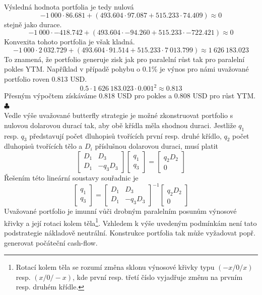 \documentclass[a4paper]{book}
\begin{document}
Výsledná hodnota portfolia je tedy nulová
\begin{equation*}
-1~000 \cdot 86.681 + (493.604 \cdot 97.087 + 515.233 \cdot 74.409) \approx 0
\end{equation*}
stejně jako durace.
\begin{equation*}
-1~000 \cdot -418.742 + (493.604 \cdot -94.260 + 515.233 \cdot -722.421) \approx 0
\end{equation*}
Konvexita tohoto portfolia je však kladná.
\begin{equation*}
-1~000 \cdot 2~032.729 + (493.604 \cdot 91.514 + 515.233 \cdot 7~013.799) \approx 1~626~183.023
\end{equation*}
To znamená, že portfolio generuje zisk jak pro paralelní růst tak pro paralelní pokles YTM. Například v případě pohybu o 0.1\% je výnos pro námi uvažované portfolio roven 0.813 USD.
\begin{equation*}
0.5 \cdot 1~626~183.023 \cdot 0.001^2 \approx 0.813
\end{equation*}
Přesným výpočtem získáváme 0.818 USD pro pokles a 0.808 USD pro růst YTM. $\clubsuit$\\

Vedle výše uvažované butterfly strategie je možné zkonstruovat portfolio s nulovou dolarovou durací tak, aby obě křídla měla shodnou duraci. Jestliže $q_1$ resp. $q_3$ představují počet dluhopisů tvořících první resp. druhé křídlo, $q_2$ počet dluhopisů tvořících tělo a $D_i$ příslušnou dolarovou duraci, musí platit
\begin{equation*}
\begin{bmatrix}
D_1 & D_3 \\
D_1 & -q_3 D_3
\end{bmatrix}
\begin{bmatrix}
q_1 \\
q_3
\end{bmatrix}
=
\begin{bmatrix}
q_2 D_2 \\
0
\end{bmatrix}
\end{equation*}
Řešením této lineární soustavy souřadnic je
\begin{equation*}
\begin{bmatrix}
q_1 \\
q_3
\end{bmatrix}
=
\begin{bmatrix}
D_1 & D_3 \\
D_1 & -q_3 D_3
\end{bmatrix}^{-1}
\begin{bmatrix}
q_2 D_2 \\
0
\end{bmatrix}
\end{equation*}
Uvažované portfolio je imunní vůči drobným paralelním posunům výnosové křivky a její rotaci kolem těla\footnote{Rotací kolem těla se rozumí změna sklonu výnosové křivky typu $(-x/0/x)$ resp. $(x/0/-x)$, kde první resp. třetí číslo vyjadřuje změnu na prvním resp. druhém křídle.}. Vzhledem k výše uvedeným podmínkám není tato podstrategie nákladově neutrální. Konstrukce portfolia tak může vyžadovat popř. generovat počáteční cash-flow.
\end{document}
